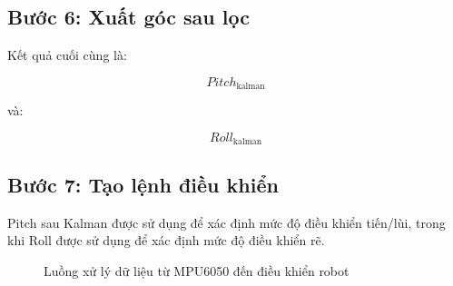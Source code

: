 \documentclass[a4paper,12pt]{report}
\begin{document}
\subsection{Bước 6: Xuất góc sau lọc}

Kết quả cuối cùng là:

\begin{equation}
Pitch_{\text{kalman}}
\end{equation}

và:

\begin{equation}
Roll_{\text{kalman}}
\end{equation}

\subsection{Bước 7: Tạo lệnh điều khiển}

Pitch sau Kalman được sử dụng để xác định mức độ điều khiển tiến/lùi, trong khi Roll được sử dụng để xác định mức độ điều khiển rẽ.

\begin{figure}[H]
    \centering
    \caption{Luồng xử lý dữ liệu từ MPU6050 đến điều khiển robot}
    \label{fig:complete-flow}
\end{figure}
\end{document}
